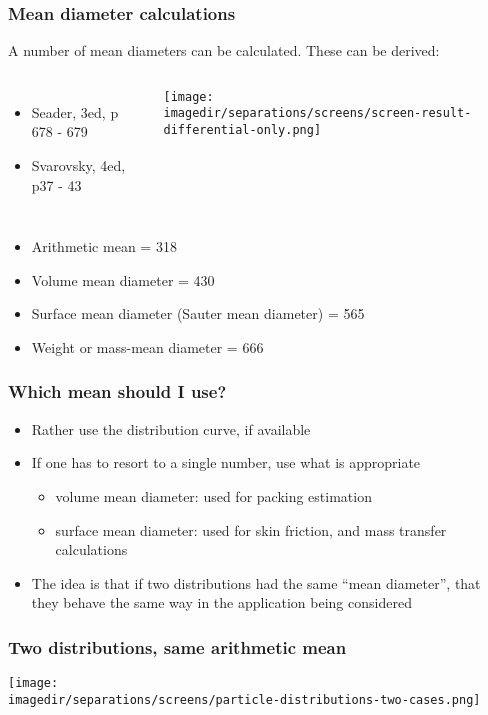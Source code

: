 \begin{frame}\frametitle{Mean diameter calculations}
	A number of mean diameters can be calculated. These can be derived:
	\begin{columns}[c]
			\scriptsize
			\begin{itemize}
				\item	Seader, 3ed, p 678 - 679
				\item	Svarovsky, 4ed, p37 - 43
			\end{itemize}
			\begin{center}
				\texttt{[image: \\imagedir/separations/screens/screen-result-differential-only.png]}
			\end{center}
	\end{columns}
	
	
	\vspace{12pt}
	\begin{itemize}
		\item	Arithmetic mean = 318 \micron
		\item	Volume mean diameter = 430 \micron
		\item	Surface mean diameter (Sauter mean diameter) = 565 \micron
		\item	Weight or mass-mean diameter = 666 \micron
	\end{itemize}
\end{frame}

\begin{frame}\frametitle{Which mean should I use?}
	\begin{itemize}
		\item	Rather use the distribution curve, if available
		\item	If one has to resort to a single number, use what is appropriate
		\begin{itemize}
			\item	volume mean diameter: used for packing estimation
			\item	surface mean diameter: used for skin friction, and mass transfer calculations
		\end{itemize}
		
		\item	The idea is that if two distributions had the same ``mean diameter'', that they behave the same way in the application being considered
	\end{itemize}
\end{frame}

\begin{frame}\frametitle{Two distributions, same arithmetic mean}
	\begin{center}
		\texttt{[image: \\imagedir/separations/screens/particle-distributions-two-cases.png]}
	\end{center}
\end{frame}

